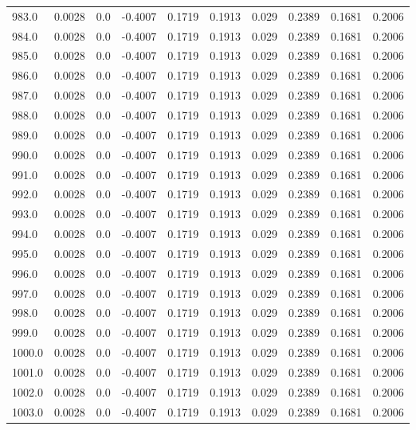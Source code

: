 \begin{longtable}{lrrrrrrrrr}
983.0 & 0.0028 & 0.0 & -0.4007 & 0.1719 & 0.1913 & 0.029 & 0.2389 & 0.1681 & 0.2006 \\
984.0 & 0.0028 & 0.0 & -0.4007 & 0.1719 & 0.1913 & 0.029 & 0.2389 & 0.1681 & 0.2006 \\
985.0 & 0.0028 & 0.0 & -0.4007 & 0.1719 & 0.1913 & 0.029 & 0.2389 & 0.1681 & 0.2006 \\
986.0 & 0.0028 & 0.0 & -0.4007 & 0.1719 & 0.1913 & 0.029 & 0.2389 & 0.1681 & 0.2006 \\
987.0 & 0.0028 & 0.0 & -0.4007 & 0.1719 & 0.1913 & 0.029 & 0.2389 & 0.1681 & 0.2006 \\
988.0 & 0.0028 & 0.0 & -0.4007 & 0.1719 & 0.1913 & 0.029 & 0.2389 & 0.1681 & 0.2006 \\
989.0 & 0.0028 & 0.0 & -0.4007 & 0.1719 & 0.1913 & 0.029 & 0.2389 & 0.1681 & 0.2006 \\
990.0 & 0.0028 & 0.0 & -0.4007 & 0.1719 & 0.1913 & 0.029 & 0.2389 & 0.1681 & 0.2006 \\
991.0 & 0.0028 & 0.0 & -0.4007 & 0.1719 & 0.1913 & 0.029 & 0.2389 & 0.1681 & 0.2006 \\
992.0 & 0.0028 & 0.0 & -0.4007 & 0.1719 & 0.1913 & 0.029 & 0.2389 & 0.1681 & 0.2006 \\
993.0 & 0.0028 & 0.0 & -0.4007 & 0.1719 & 0.1913 & 0.029 & 0.2389 & 0.1681 & 0.2006 \\
994.0 & 0.0028 & 0.0 & -0.4007 & 0.1719 & 0.1913 & 0.029 & 0.2389 & 0.1681 & 0.2006 \\
995.0 & 0.0028 & 0.0 & -0.4007 & 0.1719 & 0.1913 & 0.029 & 0.2389 & 0.1681 & 0.2006 \\
996.0 & 0.0028 & 0.0 & -0.4007 & 0.1719 & 0.1913 & 0.029 & 0.2389 & 0.1681 & 0.2006 \\
997.0 & 0.0028 & 0.0 & -0.4007 & 0.1719 & 0.1913 & 0.029 & 0.2389 & 0.1681 & 0.2006 \\
998.0 & 0.0028 & 0.0 & -0.4007 & 0.1719 & 0.1913 & 0.029 & 0.2389 & 0.1681 & 0.2006 \\
999.0 & 0.0028 & 0.0 & -0.4007 & 0.1719 & 0.1913 & 0.029 & 0.2389 & 0.1681 & 0.2006 \\
1000.0 & 0.0028 & 0.0 & -0.4007 & 0.1719 & 0.1913 & 0.029 & 0.2389 & 0.1681 & 0.2006 \\
1001.0 & 0.0028 & 0.0 & -0.4007 & 0.1719 & 0.1913 & 0.029 & 0.2389 & 0.1681 & 0.2006 \\
1002.0 & 0.0028 & 0.0 & -0.4007 & 0.1719 & 0.1913 & 0.029 & 0.2389 & 0.1681 & 0.2006 \\
1003.0 & 0.0028 & 0.0 & -0.4007 & 0.1719 & 0.1913 & 0.029 & 0.2389 & 0.1681 & 0.2006 \\

\end{longtable}
